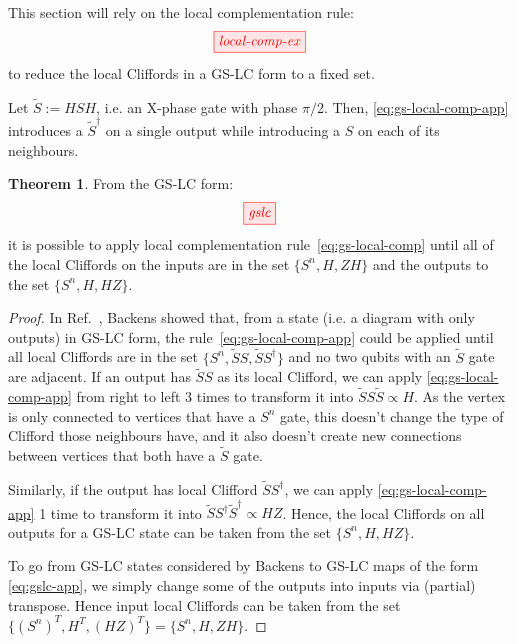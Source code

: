 \documentclass[a4paper,onecolumn,superscriptaddress,11pt,accepted=2020-04-27]{quantumarticle}
\theoremstyle{definition}
\newtheorem{theorem}{Theorem}[section]
\begin{document}
This section will rely on the local complementation rule:
\begin{equation}\label{eq:gs-local-comp-app}
\tikzfig{local-comp-ex}
\end{equation}
to reduce the local Cliffords in a GS-LC form to a fixed set.

Let $\widetilde S := HSH$, i.e. an X-phase gate with phase $\pi/2$. Then, \eqref{eq:gs-local-comp-app} introduces a $\widetilde S^\dagger$ on a single output while introducing a $S$ on each of its neighbours.

\begin{theorem}
From the GS-LC form:
\begin{equation}\label{eq:gslc-app}
\tikzfig{gslc}
\end{equation}
it is possible to apply local complementation rule~\eqref{eq:gs-local-comp} until all of the local Cliffords on the inputs are in the set $\{S^n, H, ZH\}$ and the outputs to the set $\{S^n, H, HZ \}$.
\end{theorem}

\begin{proof}
In Ref.~\cite[Thm.~13]{Backens1}, Backens showed that, from a state (i.e. a diagram with only outputs) in GS-LC form, the rule~\eqref{eq:gs-local-comp-app} could be applied until all local Cliffords are in the set $\{ S^n, \widetilde S S, \widetilde S S^\dagger \}$ and no two qubits with an $\widetilde S$ gate are adjacent. If an output has $\widetilde S S$ as its local Clifford, we can apply \eqref{eq:gs-local-comp-app} from right to left 3 times to transform it into $\widetilde S S \widetilde S \propto H$. As the vertex is only connected to vertices that have a $S^n$ gate, this doesn't change the type of Clifford those neighbours have, and it also doesn't create new connections between vertices that both have a $\widetilde S$ gate.

Similarly, if the output has local Clifford $\widetilde S S^\dagger$, we can apply \eqref{eq:gs-local-comp-app} 1 time to transform it into $\widetilde S S^\dagger \widetilde S^\dagger \propto HZ$. Hence, the local Cliffords on all outputs for a GS-LC state can be taken from the set $\{ S^n, H, HZ \}$.

To go from GS-LC states considered by Backens to GS-LC maps of the form \eqref{eq:gslc-app}, we simply change some of the outputs into inputs via (partial) transpose. Hence input local Cliffords can be taken from the set $\{ (S^n)^T, H^T, (HZ)^T \} = \{ S^n, H, ZH \}$.
\end{proof}
\end{document}
